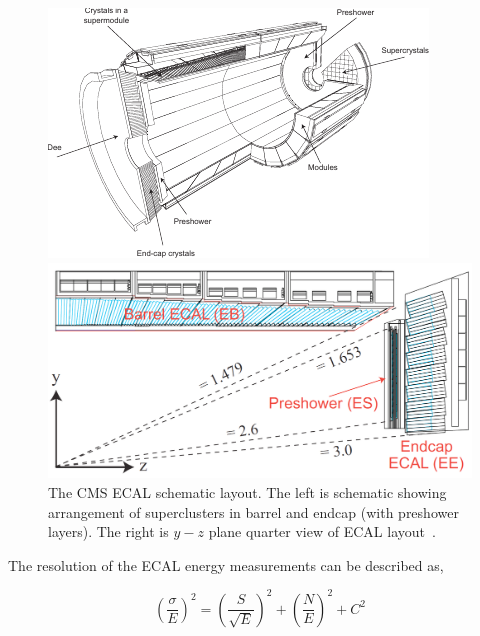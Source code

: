 \begin{figure}[!ht]
  \centering
  \begin{minipage}[c]{.60\textwidth}
    \includegraphics[width=\textwidth]{figures/cms_ecal_schematic.pdf}
  \end{minipage}
  \begin{minipage}[c]{.38\textwidth}
    \includegraphics[width=\textwidth]{figures/cms_ecal_layout.png}
  \end{minipage}
  \caption[The CMS \gls{ECAL} schematic layout]%
  {The \gls{CMS} \gls{ECAL} schematic layout. The left is schematic showing arrangement of
    superclusters in barrel and endcap (with preshower layers). The right is \(y-z \)
    plane quarter view of \gls{ECAL} layout~\cite{image-cms-ecal-layout}.}%
  \label{fig:cms-ecal-schematic}
\end{figure}

The resolution of the \gls{ECAL} energy measurements can be described as,

\begin{equation}
  {\left( \frac{\sigma}{E} \right)}^2
  = {\left( \frac{S}{\sqrt{E}} \right)}^2
  + {\left( \frac{N}{E} \right)}^2
  + C^2
\end{equation}

